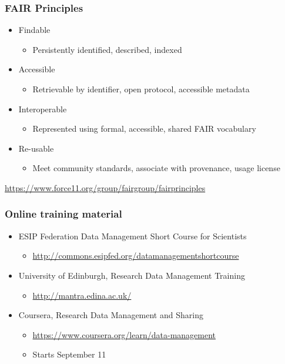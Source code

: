 \documentclass{beamer}
\begin{document}
\begin{frame}
  \frametitle{FAIR Principles}
  
  \begin{itemize}
    \item Findable
    \begin{itemize}
      \item Persistently identified, described, indexed
    \end{itemize}
    \item Accessible
    \begin{itemize}
      \item Retrievable by identifier, open protocol, accessible metadata
    \end{itemize}
    \item Interoperable
    \begin{itemize}
      \item Represented using formal, accessible, shared FAIR vocabulary
    \end{itemize}
    \item Re-usable
    \begin{itemize}
      \item Meet community standards, associate with provenance, usage license
    \end{itemize}
  \end{itemize}
  \tiny
  \begin{flushright}
    \url{https://www.force11.org/group/fairgroup/fairprinciples}
  \end{flushright}
\end{frame}

\begin{frame}
  \frametitle{Online training material}
  
  \begin{itemize}
  \item ESIP Federation Data Management Short Course for Scientists 
  \begin{itemize}
  \item \url{http://commons.esipfed.org/datamanagementshortcourse}
  \end{itemize}
  \item University of Edinburgh, Research Data Management Training
  \begin{itemize}
  \item \url{http://mantra.edina.ac.uk/}
  \end{itemize}
  \item Coursera, Research Data Management and Sharing
  \begin{itemize}
  \item \url{https://www.coursera.org/learn/data-management}
  \item Starts September 11
  \end{itemize}
  \end{itemize}
\end{frame}
\end{document}
